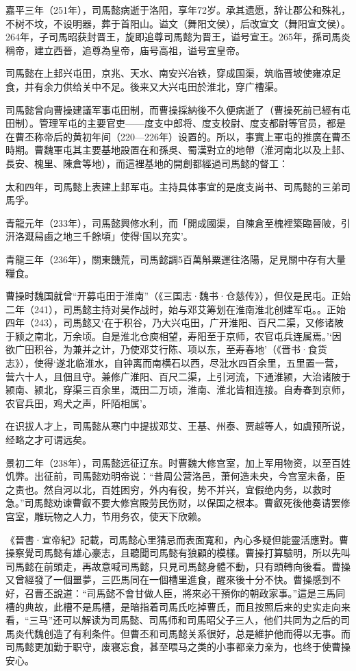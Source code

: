 嘉平三年（251年），司馬懿病逝于洛阳，享年72岁。承其遗愿，辞让郡公和殊礼，不树不坟，不设明器，葬于首阳山。谥文（舞阳文侯），后改宣文（舞阳宣文侯）。264年，子司馬昭获封晋王，旋即追尊司馬懿为晋王，谥号宣王。265年，孫司馬炎稱帝，建立西晉，追尊為皇帝，庙号高祖，谥号宣皇帝。

司馬懿在上邽兴屯田，京兆、天水、南安兴冶铁，穿成国渠，筑临晋坡使雍凉足食，并有余力供给关中不足。後来又大兴屯田於淮北，穿广槽渠。

司馬懿曾向曹操建議军事屯田制，而曹操採納後不久便病逝了（曹操死前已經有屯田制）。管理军屯的主要官吏——度支中郎将、度支校尉、度支都尉等官员，都是在曹丕称帝后的黄初年间（220—226年）设置的。所以，事實上軍屯的推廣在曹丕時期。曹魏軍屯其主要基地設置在和孫吳、蜀漢對立的地帶（淮河南北以及上邽、長安、槐里、陳倉等地），而這裡基地的開創都經過司馬懿的督工：

太和四年，司馬懿上表建上邽军屯。主持具体事宜的是度支尚书、司馬懿的三弟司馬孚。

青龍元年（233年），司馬懿興修水利，而「開成國渠，自陳倉至槐裡築臨晉陂，引汧洛溉舄鹵之地三千餘頃」使得‘国以充实’。

青龍三年（236年），關東饑荒，司馬懿調5百萬斛粟運往洛陽，足見關中存有大量糧食。

曹操时魏国就曾“开募屯田于淮南”（《三国志·魏书·仓慈传》），但仅是民屯。正始二年（241），司馬懿主持对吴作战时，始与邓艾筹划在淮南淮北创建军屯。。正始四年（243），司馬懿又‘在于积谷，乃大兴屯田，广开淮阳、百尺二渠，又修诸陂于颍之南北，万余顷。自是淮北仓庾相望，寿阳至于京师，农官屯兵连属焉。’‘因欲广田积谷，为兼并之计，乃使邓艾行陈、项以东，至寿春地’（《晋书·食货志》），使得‘遂北临淮水，自钟离而南横石以西，尽沘水四百余里，五里置一营，营六十人，且佃且守。兼修广淮阳、百尺二渠，上引河流，下通淮颍，大治诸陂于颍南、颍北，穿渠三百余里，溉田二万顷，淮南、淮北皆相连接。自寿春到京师，农官兵田，鸡犬之声，阡陌相属’。

在识拔人才上，司馬懿从寒门中提拔邓艾、王基、州泰、贾越等人，如虞预所说，经略之才可谓远矣。

景初二年（238年），司馬懿远征辽东。时曹魏大修宫室，加上军用物资，以至百姓饥弊。出征前，司馬懿劝明帝说：“昔周公营洛邑，萧何造未央，今宫室未备，臣之责也。然自河以北，百姓困穷，外内有役，势不并兴，宜假绝内务，以救时急。”司馬懿劝谏曹叡不要大修宫殿劳民伤财，以保国之根本。曹叡死後他奏请罢修宫室，雕玩物之人力，节用务农，使天下欣赖。

《晉書·宣帝紀》記載，司馬懿心里猜忌而表面寬和，內心多疑但能靈活應對。曹操察覺司馬懿有雄心豪志，且聽聞司馬懿有狼顧的模樣。曹操打算驗明，所以先叫司馬懿在前頭走，再故意喊司馬懿，只見司馬懿身體不動，只有頭轉向後看。曹操又曾經發了一個噩夢，三匹馬同在一個槽里進食，醒來後十分不快。曹操感到不好，召曹丕說道：“司馬懿不會甘做人臣，將來必干預你的朝政家事。”這是三馬同槽的典故，此槽不是馬槽，是暗指着司馬氏吃掉曹氏，而且按照后来的史实走向来看，“三马”还可以解读为司馬懿、司馬师和司馬昭父子三人，他们共同为之后的司馬炎代魏创造了有利条件。但曹丕和司馬懿关系很好，总是維护他而得以无事。而司馬懿更加勤于职守，废寝忘食，甚至喂马之类的小事都亲力亲为，也终于使曹操安心。

